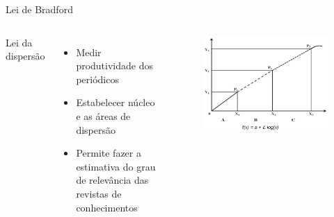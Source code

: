 \begin{frame}{Lei de Bradford}

	\begin{columns}
		Lei da dispersão
		\begin{itemize}
			\item Medir produtividade dos periódicos
			\item Estabelecer núcleo e as áreas de dispersão 
			\item Permite fazer a estimativa do grau de relevância das revistas de conhecimentos
		\end{itemize}
		\begin{figure}[hb]
			\includegraphics[width=1\textwidth]{figures/bradford.png}
		\end{figure}
	\end{columns}

\end{frame}

